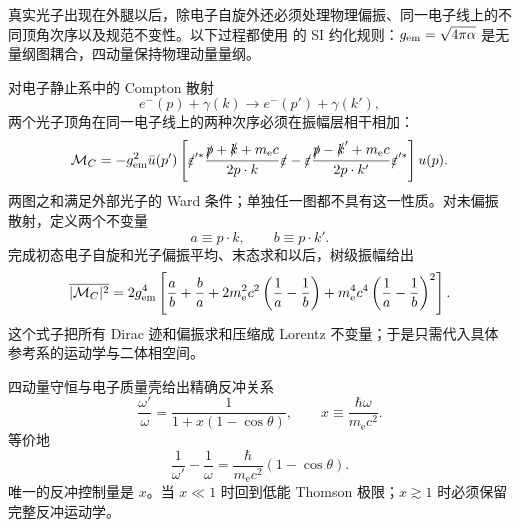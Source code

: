 
真实光子出现在外腿以后，除电子自旋外还必须处理物理偏振、同一电子线上的不同顶角次序以及规范不变性。以下过程都使用 的 SI 约化规则：\(g_{\rm em}=\sqrt{4\pi\alpha}\) 是无量纲图耦合，四动量保持物理动量量纲。

对电子静止系中的 Compton 散射
\begin{equation*}
 e^-(p)+\gamma(k)\to e^-(p')+\gamma(k'),
\end{equation*}
两个光子顶角在同一电子线上的两种次序必须在振幅层相干相加：
\begin{equation}
 {
 \mathcal M_C
 =-g_{\rm em}^2\bar u(p')\left[
 \slashed\varepsilon'^{*}
 \frac{\slashed p+\slashed k+m_{\mathrm e} c}{2p\cdot k}
 \slashed\varepsilon
 -
 \slashed\varepsilon
 \frac{\slashed p-\slashed k'+m_{\mathrm e} c}{2p\cdot k'}
 \slashed\varepsilon'^{*}
 \right]u(p).}
 \label{eq:compton-M}
\end{equation}
两图之和满足外部光子的 Ward 条件；单独任一图都不具有这一性质。对未偏振散射，定义两个不变量
\begin{equation*}
 a\equiv p\cdot k,\qquad b\equiv p\cdot k'.
\end{equation*}
完成初态电子自旋和光子偏振平均、末态求和以后，树级振幅给出
\begin{equation}
 {
 \overline{|\mathcal M_C|^2}
 =2g_{\rm em}^4\left[
 \frac ab+\frac ba
 +2m_{\mathrm e}^2c^2\left(\frac1a-\frac1b\right)
 +m_{\mathrm e}^4c^4\left(\frac1a-\frac1b\right)^2
 \right].}
 \label{eq:compton-M2-unpolarized-dp73}
\end{equation}
这个式子把所有 Dirac 迹和偏振求和压缩成 Lorentz 不变量；于是只需代入具体参考系的运动学与二体相空间。

四动量守恒与电子质量壳给出精确反冲关系
\begin{equation}
 {
 \frac{\omega'}{\omega}
 =\frac{1}{1+x(1-\cos\theta)},
 \qquad
 x\equiv\frac{\hbar\omega}{m_{\mathrm e} c^2}.}
 \label{eq:compton-energy-ratio}
\end{equation}
等价地
\begin{equation}
 {
 \frac1{\omega'}-\frac1\omega
 =\frac{\hbar}{m_{\mathrm e} c^2}(1-\cos\theta).}
 \label{eq:compton-shift-SI}
\end{equation}
唯一的反冲控制量是 \(x\)。当 \(x\ll1\) 时回到低能 Thomson 极限；\(x\gtrsim1\) 时必须保留完整反冲运动学。


